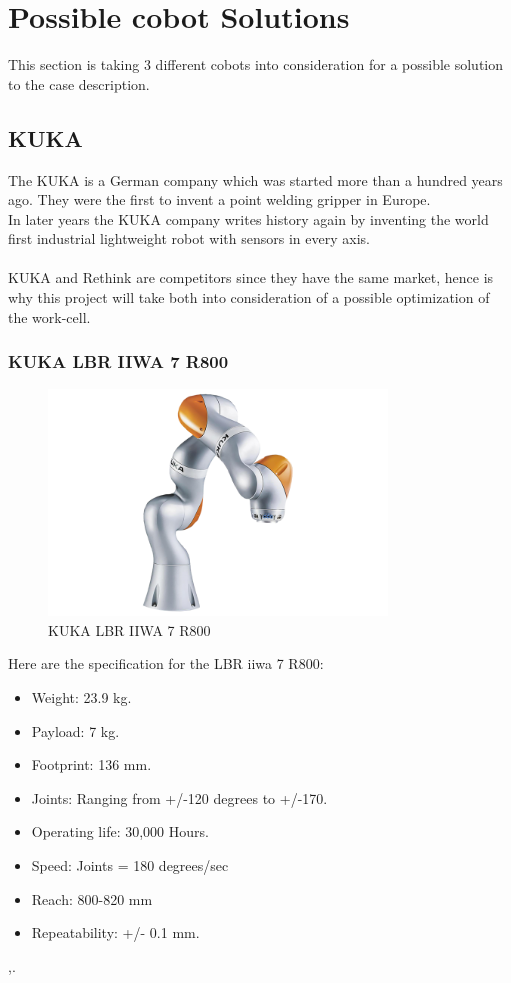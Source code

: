 
\section{Possible cobot Solutions} \label{ch:UR}

This section is taking 3 different cobots into consideration for a possible solution to the case description.

\subsection{KUKA}

The KUKA is a German company which was started more than a hundred years ago. They were the first to invent a point welding gripper in Europe.\\
In later years the KUKA company writes history again by inventing the world first industrial lightweight robot with sensors in every axis.\\
\\
KUKA and Rethink are competitors since they have the same market, hence is why this project will take both into consideration of a possible optimization of the work-cell\cite{KukaHist}.\\


\subsubsection{KUKA LBR IIWA 7 R800}
\begin{figure}[H]
    \centering
    \includegraphics[width=9cm]{UR/1502895088_1.png}
    \caption{KUKA LBR IIWA 7 R800 \cite{KUKAbillede}}
    \label{fig:LBR IIWA}
\end{figure}

Here are the specification for the LBR iiwa 7 R800:\\

\begin{itemize}
    \item Weight: 23.9 kg.
    \item Payload: 7 kg.
    \item Footprint: 136 mm.
    \item Joints: Ranging from +/-120 degrees to +/-170.
    \item Operating life: 30,000 Hours.
    \item Speed: Joints = 180 degrees/sec
    \item Reach: 800-820 mm
    \item Repeatability: +/- 0.1 mm.
\end{itemize}
\cite{KukaSpec1},\cite{KukaSpec2}.

